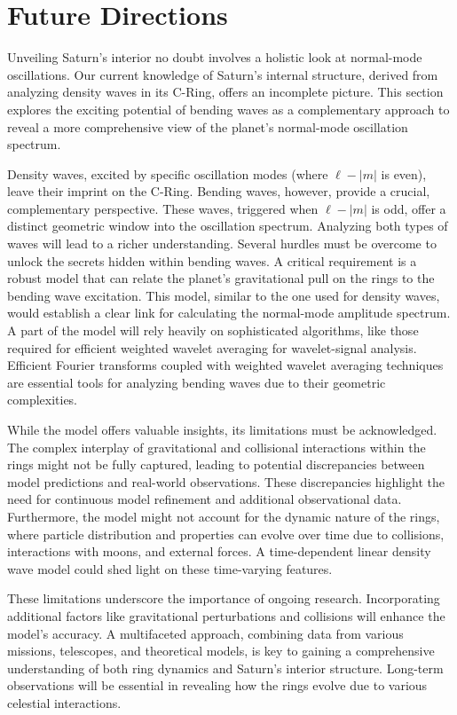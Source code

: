 \documentclass{article}
\begin{document}
\section{Future Directions}

Unveiling Saturn's interior no doubt involves a holistic look at normal-mode oscillations. Our current knowledge of Saturn's internal structure, derived from analyzing density waves in its C-Ring, offers an incomplete picture. This section explores the exciting potential of bending waves as a complementary approach to reveal a more comprehensive view of the planet's normal-mode oscillation spectrum.

Density waves, excited by specific oscillation modes (where $\ell - |m|$ is even), leave their imprint on the C-Ring. Bending waves, however, provide a crucial, complementary perspective. These waves, triggered when $\ell - |m|$ is odd, offer a distinct geometric window into the oscillation spectrum. Analyzing both types of waves will lead to a richer understanding. Several hurdles must be overcome to unlock the secrets hidden within bending waves. A critical requirement is a robust model that can relate the planet's gravitational pull on the rings to the bending wave excitation. This model, similar to the one used for density waves, would establish a clear link for calculating the normal-mode amplitude spectrum. A part of the model will rely heavily on sophisticated algorithms, like those required for efficient weighted wavelet averaging for wavelet-signal analysis. Efficient Fourier transforms coupled with weighted wavelet averaging techniques are essential tools for analyzing bending waves due to their geometric complexities.

While the model offers valuable insights, its limitations must be acknowledged. The complex interplay of gravitational and collisional interactions within the rings might not be fully captured, leading to potential discrepancies between model predictions and real-world observations. These discrepancies highlight the need for continuous model refinement and additional observational data. Furthermore, the model might not account for the dynamic nature of the rings, where particle distribution and properties can evolve over time due to collisions, interactions with moons, and external forces. A time-dependent linear density wave model could shed light on these time-varying features.

These limitations underscore the importance of ongoing research. Incorporating additional factors like gravitational perturbations and collisions will enhance the model's accuracy.  A multifaceted approach, combining data from various missions, telescopes, and theoretical models, is key to gaining a comprehensive understanding of both ring dynamics and Saturn's interior structure. Long-term observations will be essential in revealing how the rings evolve due to various celestial interactions.
\end{document}
